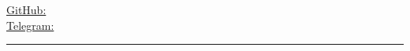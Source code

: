 \begin{center}
	\begin{minipage}[b]{.3\textwidth}
	\raggedright
	{\city} \\ %
	\href{mailto:\email}{\email} %
	\end{minipage}%
	\begin{minipage}[b]{.4\textwidth}
	\makeatletter
	\centering {\Huge \@author} \\
	\makeatother
    \vspace{.5em}
    {\color{highlight} \Large{\role}}
	\end{minipage}%
	\begin{minipage}[b]{.3\textwidth}
	\raggedleft 
	\href{https://github.com/\github}{GitHub: \github} \\%
	\href{https://t.me/\LinkedIn}{Telegram: \LinkedIn} 
	\end{minipage}
	\vspace{-2mm}

{\color{highlight} \hrule}
\end{center}